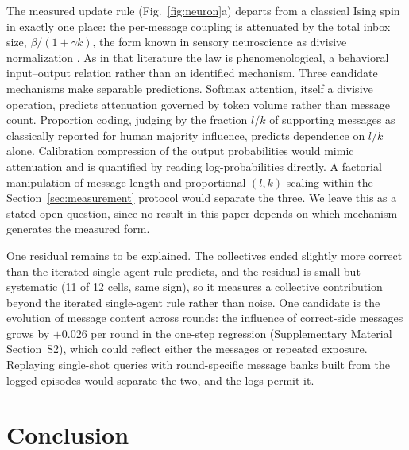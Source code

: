 \documentclass{ieeeaccess}
\begin{document}
The measured update rule (Fig.~\ref{fig:neuron}a) departs from a classical
Ising spin in exactly one place: the per-message coupling is attenuated by
the total inbox size, $\beta/(1+\gamma k)$, the form known in sensory
neuroscience as divisive normalization \cite{CarandiniHeeger2012}. As in
that literature the law is phenomenological, a behavioral input--output
relation rather than an identified mechanism. Three candidate mechanisms
make separable predictions. Softmax attention, itself a divisive operation,
predicts attenuation governed by token volume rather than message count.
Proportion coding, judging by the fraction $l/k$ of supporting messages as
classically reported for human majority influence, predicts dependence on
$l/k$ alone. Calibration compression of the output probabilities would mimic
attenuation and is quantified by reading log-probabilities directly. A
factorial manipulation of message length and proportional $(l, k)$ scaling
within the Section~\ref{sec:measurement} protocol would separate the three.
We leave this as a stated open question, since no result in this paper
depends on which mechanism generates the measured form.

One residual remains to be explained. The collectives ended slightly more
correct than the iterated single-agent rule predicts, and the residual is
small but systematic (11 of 12 cells, same sign), so it measures a
collective contribution beyond the iterated single-agent rule rather than
noise. One candidate is the evolution of message content across rounds: the
influence of correct-side messages grows by $+0.026$ per round in the
one-step regression (Supplementary Material Section~S2), which could reflect either the messages or
repeated exposure. Replaying single-shot queries with round-specific
message banks built from the logged episodes would separate the two, and
the logs permit it.

\section{Conclusion}\label{sec:conclusion}
\end{document}
